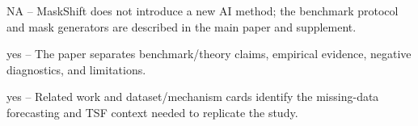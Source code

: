 \documentclass[letterpaper]{article}
\begin{document}
\begin{itemize}

NA -- MaskShift does not introduce a new AI method; the benchmark protocol and mask generators are described in the main paper and supplement.

yes -- The paper separates benchmark/theory claims, empirical evidence, negative diagnostics, and limitations.

yes -- Related work and dataset/mechanism cards identify the missing-data forecasting and TSF context needed to replicate the study.

\end{itemize}
\end{document}
